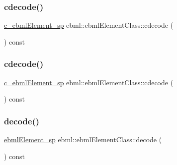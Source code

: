 \subsubsection{\texorpdfstring{cdecode()}{cdecode()}\hspace{0.1cm}{\footnotesize\ttfamily [5/6]}}
{\footnotesize\ttfamily \mbox{\hyperlink{namespaceebml_a2deef4e8071531b32e3533f1bf978917}{c\+\_\+ebml\+Element\+\_\+sp}} ebml\+::ebml\+Element\+Class\+::cdecode (\begin{DoxyParamCaption}\item[{\mbox{\hyperlink{namespaceebml_a7bb59128ac6af27e47367938a846b569}{io\+Base\+\_\+sp}} \&}]{ }\end{DoxyParamCaption}) const}

\mbox{\label{classebml_1_1ebmlElementClass_a583586c72ae328913f0a920843d46677}} 
\subsubsection{\texorpdfstring{cdecode()}{cdecode()}\hspace{0.1cm}{\footnotesize\ttfamily [6/6]}}
{\footnotesize\ttfamily \mbox{\hyperlink{namespaceebml_a2deef4e8071531b32e3533f1bf978917}{c\+\_\+ebml\+Element\+\_\+sp}} ebml\+::ebml\+Element\+Class\+::cdecode (\begin{DoxyParamCaption}\item[{\mbox{\hyperlink{classebml_1_1ioBase}{io\+Base}} $\ast$}]{ }\end{DoxyParamCaption}) const}

\mbox{\label{classebml_1_1ebmlElementClass_a9de19726c4794e4e3cb1f32e445c5002}} 
\subsubsection{\texorpdfstring{decode()}{decode()}\hspace{0.1cm}{\footnotesize\ttfamily [1/10]}}
{\footnotesize\ttfamily \mbox{\hyperlink{namespaceebml_adad533b7705a16bb360fe56380c5e7be}{ebml\+Element\+\_\+sp}} ebml\+::ebml\+Element\+Class\+::decode (\begin{DoxyParamCaption}\item[{const \mbox{\hyperlink{classebml_1_1parseString}{parse\+String}} \&}]{ }\end{DoxyParamCaption}) const}

